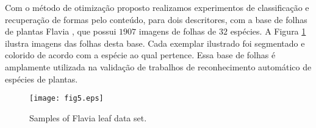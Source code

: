 Com o método de otimização proposto realizamos experimentos de classificação e recuperação de formas pelo conteúdo, para dois descritores, com a base de folhas de plantas Flavia \cite{4458016},  que possui $1907$ imagens de folhas de $32$ espécies. A Figura \ref{fig:bases} ilustra imagens das folhas desta base. Cada exemplar ilustrado foi segmentado e colorido de acordo com a espécie ao qual pertence. Essa base de folhas é amplamente utilizada na validação de trabalhos de reconhecimento automático de espécies de plantas. 

\begin{figure}[!htb]
\centering
\texttt{[image: fig5.eps]}
\caption{\label{fig:bases}Samples of Flavia leaf data set.}
\end{figure}


